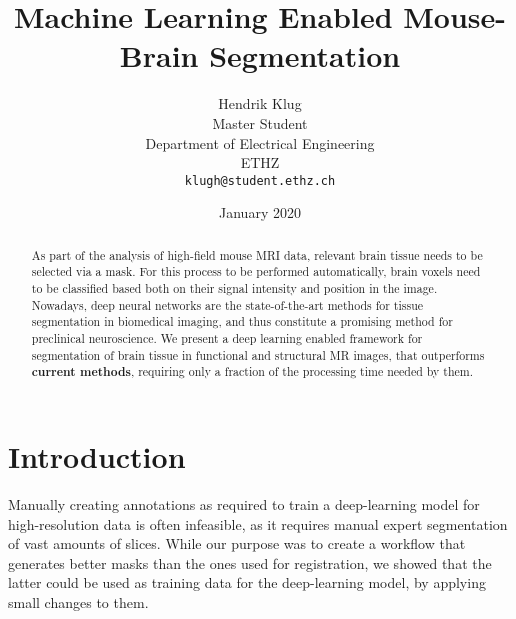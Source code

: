 \documentclass{article}
\title{Machine Learning Enabled Mouse-Brain Segmentation}
\author{
 Hendrik Klug \\
  Master Student\\
  Department of Electrical Engineering\\
  ETHZ\\
  \texttt{klugh@student.ethz.ch} \\\date{January 2020}}
\begin{document}
\maketitle

\begin{abstract}
As part of the analysis of high-field mouse MRI data, relevant brain tissue needs to be selected via a mask.
For this process to be performed automatically, brain voxels need to be classified based both on their signal intensity and position in the image.
Nowadays, deep neural networks are the state-of-the-art methods for tissue segmentation in biomedical imaging, and thus constitute a promising method for preclinical neuroscience.
We present a deep learning enabled framework for segmentation of brain tissue in functional and structural MR images, that outperforms \textbf{current methods}, requiring only a fraction of the processing time needed by them.
\end{abstract}


\section{Introduction}
Manually creating annotations as required to train a deep-learning model for high-resolution data is often infeasible, as it requires manual expert segmentation of vast amounts of slices.
While our purpose was to create a workflow that generates better masks than the ones used for registration, we showed that the latter could be used as training data for the deep-learning model, by applying small changes to them.
\end{document}
